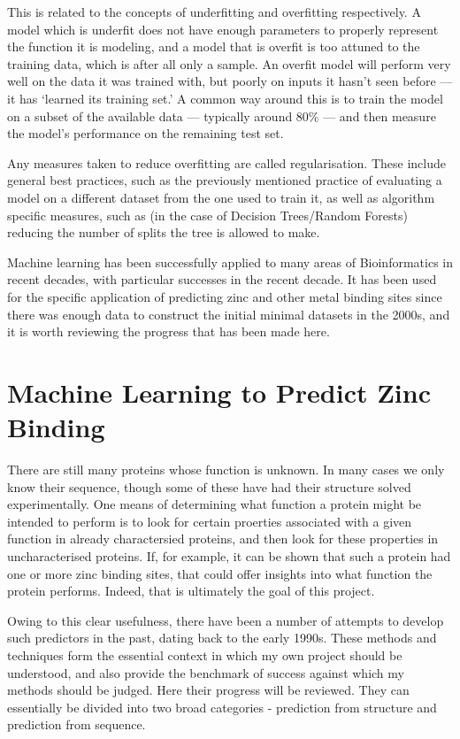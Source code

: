 This is related to the concepts of underfitting and overfitting respectively. A model which is underfit does not have enough parameters to properly represent the function it is modeling, and a model that is overfit is too attuned to the training data, which is after all only a sample. An overfit model will perform very well on the data it was trained with, but poorly on inputs it hasn't seen before --- it has `learned its training set.' A common way around this is to train the model on a subset of the available data --- typically around 80\% --- and then measure the model's performance on the remaining test set. 

Any measures taken to reduce overfitting are called regularisation. These include general best practices, such as the previously mentioned practice of evaluating a model on a different dataset from the one used to train it, as well as algorithm specific measures, such as (in the case of Decision Trees/Random Forests) reducing the number of splits the tree is allowed to make.

Machine learning has been successfully applied to many areas of Bioinformatics in recent decades, with particular successes in the recent decade. It has been used for the specific application of predicting zinc and other metal binding sites since there was enough data to construct the initial minimal datasets in the 2000s, and it is worth reviewing the progress that has been made here.

\section{Machine Learning to Predict Zinc Binding}

There are still many proteins whose function is unknown. In many cases we only know their sequence, though some of these have had their structure solved experimentally. One means of determining what function a protein might be intended to perform is to look for certain proerties associated with a given function in already charactersied proteins, and then look for these properties in uncharacterised proteins. If, for example, it can be shown that such a protein had one or more zinc binding sites, that could offer insights into what function the protein performs. Indeed, that is ultimately the goal of this project.

Owing to this clear usefulness, there have been a number of attempts to develop such predictors in the past, dating back to the early 1990s. These methods and techniques form the essential context in which my own project should be understood, and also provide the benchmark of success against which my methods should be judged. Here their progress will be reviewed. They can essentially be divided into two broad categories - prediction from structure and prediction from sequence.


